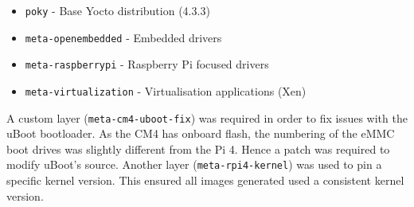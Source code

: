 \begin{itemize}
    \item \verb|poky| - Base Yocto distribution (4.3.3) \autocite{yoctoPokyPokyBuild2024}
    \item \verb|meta-openembedded| - Embedded drivers \autocite{openembeddedOpenembeddedMetaopenembedded2024}
    \item \verb|meta-raspberrypi| - Raspberry Pi focused drivers \autocite{yoctoMetaraspberrypiHardwareSpecific}
    \item \verb|meta-virtualization| - Virtualisation applications (Xen) \autocite{yoctoMetavirtualizationLayerEnabling}
\end{itemize}


A custom layer (\verb|meta-cm4-uboot-fix|) was required in order to fix issues with the uBoot bootloader. As the CM4 has onboard flash, the numbering of the eMMC boot drives was slightly different from the Pi 4. Hence a patch was required to modify uBoot's source. Another layer (\verb|meta-rpi4-kernel|) was used to pin a specific kernel version. This ensured all images generated used a consistent kernel version.